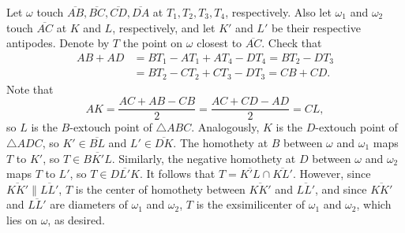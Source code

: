 Let $\omega$ touch $\overline{AB},\overline{BC},\overline{CD},\overline{DA}$ at $T_1,T_2,T_3,T_4$, respectively. Also let $\omega_1$ and $\omega_2$ touch $\overline{AC}$ at $K$ and $L$, respectively, and let $K'$ and $L'$ be their respective antipodes. Denote by $T$ the point on $\omega$ closest to $\overline{AC}$. Check that
\begin{align*}
    AB+AD&=BT_1-AT_1+AT_4-DT_4=BT_2-DT_3\\
    &=BT_2-CT_2+CT_3-DT_3=CB+CD.
\end{align*}
Note that \[AK=\frac{AC+AB-CB}2=\frac{AC+CD-AD}2=CL,\]
so $L$ is the $B$-extouch point of $\triangle ABC$. Analogously, $K$ is the $D$-extouch point of $\triangle ADC$, so $K'\in\overline{BL}$ and $L'\in\overline{DK}$. The homothety at $B$ between $\omega$ and $\omega_1$ maps $T$ to $K'$, so $T\in\overline{BK'L}$. Similarly, the negative homothety at $D$ between $\omega$ and $\omega_2$ maps $T$ to $L'$, so $T\in\overline{DL'K}$. It follows that $T=\overline{K'L}\cap\overline{KL'}$. However, since $\overline{KK'}\parallel\overline{LL'}$, $T$ is the center of homothety between $\overline{KK'}$ and $\overline{LL'}$, and since $\overline{KK'}$ and $\overline{LL'}$ are diameters of $\omega_1$ and $\omega_2$, $T$ is the exsimilicenter of $\omega_1$ and $\omega_2$, which lies on $\omega$, as desired. 

